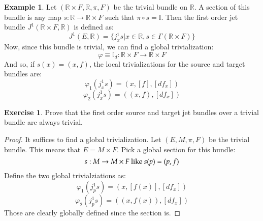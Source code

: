 \documentclass[12pt,a4paper]{report}
\theoremstyle{definition}
\theoremstyle{Theorem}
\theoremstyle{break}
\newtheorem{Ex}[Def]{Example}
\newtheorem{Exe}[Def]{Exercise}
\theoremstyle{definition}
\begin{document}
	\begin{Ex}
		Let $(\mathbb{R}\times F,\mathbb{R},\pi,F)$ be the trivial bundle on $\mathbb{R}$. A section of this bundle is any map $s:\mathbb{R}\rightarrow \mathbb{R}\times F$ such that $\pi\circ s=\mathbb{I}$.
		Then the first order jet bundle $J^1(\mathbb{R}\times F,\mathbb{R})$ is defined as:
		$$J^1(E,\mathbb{R})=\{j^1_xs\big|x\in\mathbb{R},s\in\Gamma(\mathbb{R}\times F)\}$$
		Now, since this bundle is trivial, we can find a global trivialization:
		$$\varphi\equiv \mathbb{I}_d:\mathbb{R}\times F\rightarrow \mathbb{R}\times F$$
		And so, if $s(x)=(x,f)$, the local trivializations for the source and target bundles are:
		$$\varphi_1(j^1_xs)=(x,[f],[df_x])$$
		$$\varphi_2(j^1_xs)=((x,f),[df_x])$$
	\end{Ex}
	\begin{Exe}
		Prove that the first order source and target jet bundles over a trivial bundle are always trivial.
	\end{Exe}
	\begin{proof}
		It suffices to find a global trivialization. Let $(E,M,\pi,F)$ be the trivial bundle. This means that $E=M\times F$. Pick a global section for this bundle:
		$$s:M\rightarrow M\times F\hbox{ like }s(p)=(p,f)$$
		Define the two global trivialziations as:
		$$\varphi_1(j^1_ps)=(x,[f(x)],[df_x])$$
		$$\varphi_2(j^1_ps)=((x,f(x)),[df_x])$$
		Those are clearly globally defined since the section is.
	\end{proof}
\end{document}
